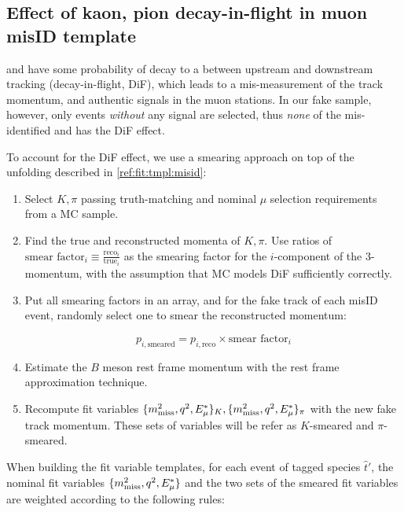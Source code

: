\subsection{Effect of kaon, pion decay-in-flight in muon misID template}
\label{ref:fit:var:misid-dif}

\kaon and \pion have some probability of decay to a \muon between upstream and
downstream tracking (decay-in-flight, DiF),
which leads to a mis-measurement of the track momentum,
and authentic signals in the muon stations.
In our fake \muon sample, however, only events \emph{without} any \muon
signal are selected, thus \emph{none} of the mis-identified \kaon and \pion has
the DiF effect.

To account for the DiF effect, we use a smearing approach on top of the
unfolding described in \cref{ref:fit:tmpl:misid}:

\begin{enumerate}
    \item Select $K, \pi$ passing truth-matching and nominal $\mu$ selection
        requirements from a MC sample.

    \item Find the true and reconstructed momenta of
        $K, \pi$.
        Use ratios of
        $\text{smear factor}_i \equiv \frac{\text{reco}_i}{\text{true}_i}$
        as the smearing factor for the $i$-component of the 3-momentum,
        with the assumption that MC models DiF sufficiently correctly.

    \item Put all smearing factors in an array,
        and for the fake \muon track of each misID event,
        randomly select one to smear the reconstructed momentum:

        \begin{equation}
            p_{i,\text{smeared}} =
                p_{i,\text{reco}} \times \text{smear factor}_i
        \end{equation}

    \item Estimate the $B$ meson rest frame momentum with the rest frame
        approximation technique. %
    \item Recompute fit variables
        $\{m^2_\text{miss}, q^2, E^*_{\mu}\}_K, \{m^2_\text{miss}, q^2, E^*_{\mu}\}_\pi$
        with the new fake \muon track momentum.
        These sets of variables will be refer as $K$-smeared and $\pi$-smeared.
\end{enumerate}

When building the fit variable templates, for each event of tagged species
$\hat{t}'$,
the nominal fit variables $\{m^2_\text{miss}, q^2, E^*_{\mu}\}$ and the two sets of the smeared
fit variables are weighted according to the following rules:

